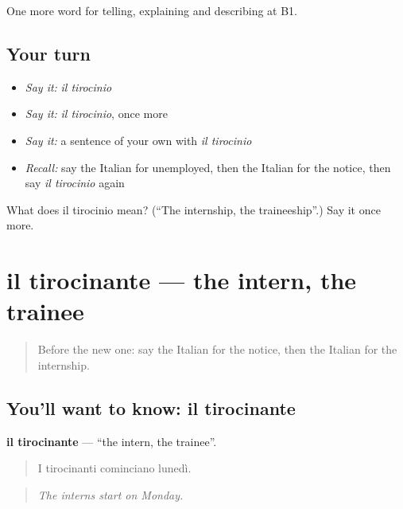 \begin{grammarlens}[title={What you've built}]
One more word for telling, explaining and describing at B1.
\end{grammarlens}

\subsection*{Your turn}
\begin{itemize}
\raggedright
  \item \emph{Say it:} \emph{il tirocinio}
  \item \emph{Say it:} \emph{il tirocinio}, once more
  \item \emph{Say it:} a sentence of your own with \emph{il tirocinio}
  \item \emph{Recall:} say the Italian for unemployed, then the Italian for the notice, then say \emph{il tirocinio} again
\end{itemize}

\begin{tcolorbox}[breakable,colback=teal!4,colframe=teal!35!black,title={Before you move on}]
What does il tirocinio mean? (\textquotedblleft{}The internship, the traineeship\textquotedblright{}.) Say it once more.
\end{tcolorbox}
\section[il tirocinante]{il tirocinante — the intern, the trainee}

\label{lesson:IT-C358-tirocinante}



\begin{quote}
Before the new one: say the Italian for the notice, then the Italian for the internship.
\end{quote}

\subsection*{You'll want to know: il tirocinante}
\textbf{il tirocinante} — \textquotedblleft{}the intern, the trainee\textquotedblright{}.

\begin{quote}
I tirocinanti cominciano lunedì.
\end{quote}

\begin{quote}
\emph{The interns start on Monday.}
\end{quote}

